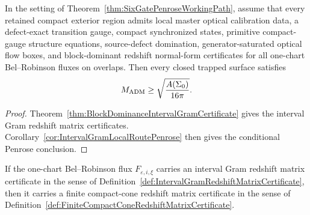 \begin{corollary}\label{cor:BlockDominantLocalRoutePenrose}
In the setting of Theorem~\ref{thm:SixGatePenroseWorkingPath}, assume that every
retained compact exterior region admits local master optical calibration data, a
defect-exact transition gauge, compact synchronized states, primitive
compact-gauge structure equations, source-defect domination, generator-saturated
optical flow boxes, and block-dominant redshift normal-form certificates for all
one-chart Bel--Robinson fluxes on overlaps. Then every closed trapped surface
satisfies
\[
    M_{\mathrm{ADM}}\ge \sqrt{\frac{A(\Sigma_0)}{16\pi}} .
\]
\end{corollary}

\begin{proof}
Theorem~\ref{thm:BlockDominanceIntervalGramCertificate} gives the interval Gram
redshift matrix certificates.  Corollary~\ref{cor:IntervalGramLocalRoutePenrose}
then gives the conditional Penrose conclusion.
\end{proof}

\begin{theorem}\label{thm:IntervalGramRedshiftMatrixCertificateFiniteCone}
If the one-chart Bel--Robinson flux $F_{\varepsilon,i,\xi}$ carries an interval
Gram redshift matrix certificate in the sense of
Definition~\ref{def:IntervalGramRedshiftMatrixCertificate}, then it carries a
finite compact-cone redshift matrix certificate in the sense of
Definition~\ref{def:FiniteCompactConeRedshiftMatrixCertificate}.
\end{theorem}

